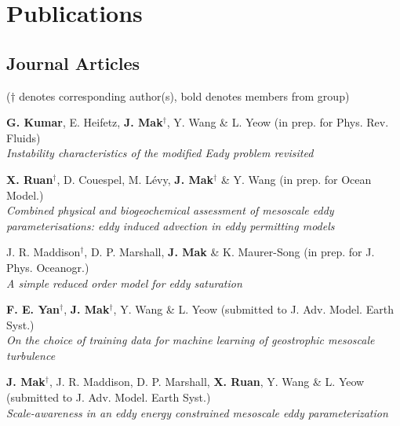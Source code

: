 \documentclass[letterpaper]{article}
\renewenvironment{itemize}{
  \begin{list}{}{
    \setlength{\leftmargin}{1.5em}
  }
}{
  \end{list}
}
\begin{document}
\section*{Publications}
\subsection*{Journal Articles}

($\dagger$ denotes corresponding author(s), bold denotes members from group)

\begin{itemize}


\item[*] \textbf{G. Kumar}, E. Heifetz, \textbf{J. Mak}$^{\dagger}$, Y. Wang \& L. Yeow (in prep. for Phys. Rev. Fluids)\\
\textit{Instability characteristics of the modified Eady problem revisited}

\item[*] \textbf{X. Ruan}$^{\dagger}$, D. Couespel, M. L\'evy, \textbf{J. Mak}$^{\dagger}$ \& Y. Wang (in prep. for Ocean Model.)\\
\textit{Combined physical and biogeochemical assessment of mesoscale eddy parameterisations: eddy induced advection in eddy permitting models}

\item[*] J. R. Maddison$^{\dagger}$, D. P. Marshall, \textbf{J. Mak} \& K. Maurer-Song (in prep. for J. Phys. Oceanogr.)\\
\textit{A simple reduced order model for eddy saturation}

\item[*] \textbf{F. E. Yan}$^{\dagger}$, \textbf{J. Mak}$^{\dagger}$, Y. Wang \& L. Yeow (submitted to J. Adv. Model. Earth Syst.)\\
\textit{On the choice of training data for machine learning of geostrophic mesoscale turbulence}

\item[*] \textbf{J. Mak}$^{\dagger}$, J. R. Maddison, D. P. Marshall, \textbf{X. Ruan}, Y. Wang \& L. Yeow (submitted to J. Adv. Model. Earth Syst.)\\
\textit{Scale-awareness in an eddy energy constrained mesoscale eddy parameterization}


\end{itemize}
\end{document}
